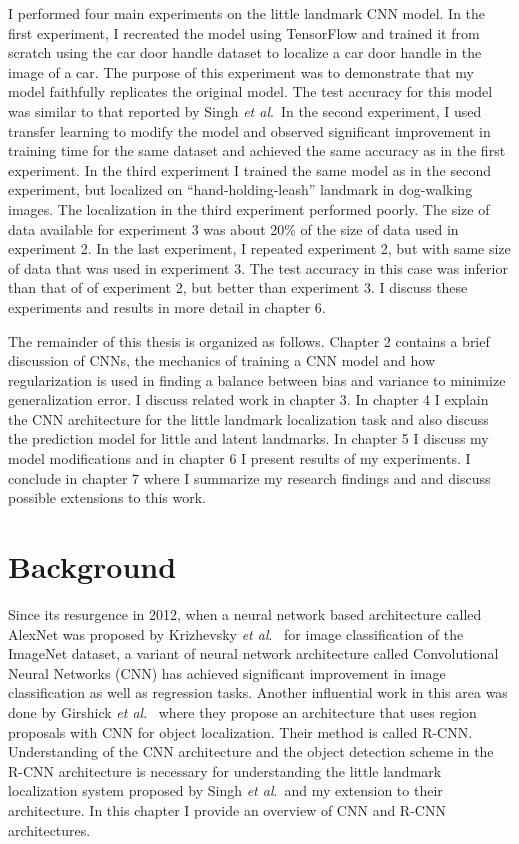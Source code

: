 \documentclass [11pt,letterpaper ,twoside ,openany ]{report}
\begin{document}
    I performed four main experiments on the little landmark CNN model. In the first experiment, I recreated the model using TensorFlow \cite{girija2016tensorflow} and trained it from scratch using the car door handle dataset to localize a car door handle in the image of a car. The purpose of this experiment was to demonstrate that my model faithfully replicates the original model. The test accuracy for this model was similar to that reported by Singh \textit{et al}.\ In the second experiment, I used transfer learning to modify the model and observed significant improvement in training time for the same dataset and achieved the same accuracy as in the first experiment. In the third experiment I trained the same model as in the second experiment, but localized on ``hand-holding-leash'' landmark in dog-walking images. The localization in the third experiment performed poorly. The size of data available for experiment 3 was about 20\% of the size of data used in experiment 2. In the last experiment, I repeated experiment 2, but with same size of data that was used in experiment 3. The test accuracy in this case was inferior than that of of experiment 2, but better than experiment 3. I discuss these experiments and results in more detail in chapter 6.

    The remainder of this thesis is organized as follows. Chapter 2 contains a brief discussion of CNNs, the mechanics of training a CNN model and how regularization is used in finding a balance between bias and variance to minimize generalization error. I discuss related work in chapter 3. In chapter 4 I explain the CNN architecture for the little landmark localization task and also discuss the prediction model for little and latent landmarks. In chapter 5 I discuss my model modifications and in chapter 6 I present results of my experiments. I conclude in chapter 7 where I summarize my research findings and and discuss possible extensions to this work.

    \chapter{Background}
    \doublespacing
    Since its resurgence in 2012, when a neural network based architecture called AlexNet was proposed by Krizhevsky \textit{et al}.\ \cite{krizhevsky2012imagenet} for image classification of the ImageNet \cite{russakovsky2015imagenet} dataset, a variant of neural network architecture called Convolutional Neural Networks (CNN) has achieved significant improvement in image classification as well as regression tasks. Another influential work in this area was done by Girshick \textit{et al}.\ \cite{girshick2014rich} where they propose an architecture that uses region proposals with CNN for object localization. Their method is called R-CNN. Understanding of the CNN architecture and the object detection scheme in the R-CNN architecture is necessary for understanding the little landmark localization system proposed by Singh \textit{et al}.\ and my extension to their architecture. In this chapter I provide an overview of CNN and R-CNN architectures. 
\end{document}
